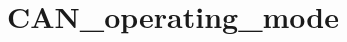 \hypertarget{group___c_a_n__operating__mode}{\section{C\-A\-N\-\_\-operating\-\_\-mode}
\label{group___c_a_n__operating__mode}
}

